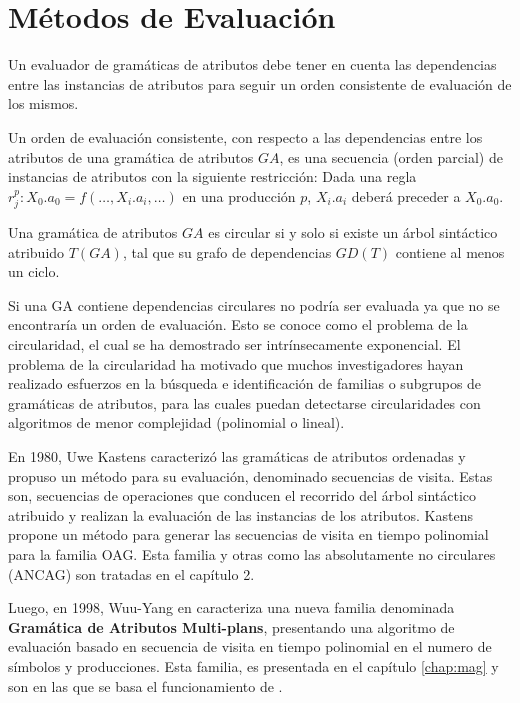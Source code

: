 \section{Métodos de Evaluación}
\label{sec:met_eval}
Un evaluador de gramáticas de atributos debe tener en cuenta las dependencias entre las instancias de atributos para seguir un orden consistente de evaluación de los mismos.
\begin{definition} Un orden de evaluación consistente, con respecto a las dependencias entre los atributos de una gramática de atributos $GA$, es una secuencia (orden parcial) de instancias de atributos con la siguiente restricción:
Dada una regla $r_{j}^{p} : X_{0}.a_{0} = f(\ldots, X_{i}.a_{i}, \ldots)$ en una producción $p$, 
$X_{i}.a_{i}$ deberá preceder a $X_{0}.a_{0}$.
\end{definition}

\begin{definition} 
Una gramática de atributos $GA$ es circular si y solo si existe un árbol sintáctico atribuido $T(GA)$, tal que su grafo de dependencias $GD(T)$ contiene al menos un ciclo.
\end{definition}

Si una GA contiene dependencias circulares no podría ser evaluada ya que no se encontraría un orden de evaluación. Esto se conoce como el problema de la circularidad, el cual se ha demostrado ser intrínsecamente exponencial\cite{intri-exc}. El problema de la circularidad ha motivado que muchos investigadores hayan realizado esfuerzos en la búsqueda e identificación de familias o subgrupos de gramáticas de atributos, para las cuales puedan detectarse circularidades con algoritmos de menor complejidad (polinomial o lineal).

En 1980, Uwe Kastens\cite{kastens} caracterizó las gramáticas de atributos ordenadas y propuso un método para su evaluación, denominado secuencias de visita. Estas son, secuencias de operaciones que conducen el recorrido del árbol sintáctico atribuido y realizan la evaluación de las instancias de los atributos. Kastens propone un método para generar las secuencias de visita en tiempo polinomial para la familia OAG. Esta familia y otras como las absolutamente no circulares (ANCAG) son tratadas en el capítulo 2.

Luego, en 1998, Wuu-Yang en \cite{wuu-yang1} caracteriza una nueva familia denominada \textbf{Gramática de Atributos Multi-plans}, presentando una algoritmo de evaluación basado en secuencia de visita en tiempo polinomial en el numero de símbolos y producciones. Esta familia, es presentada en el capítulo \ref{chap:mag} y son en las que se basa el funcionamiento de \maggen.  


